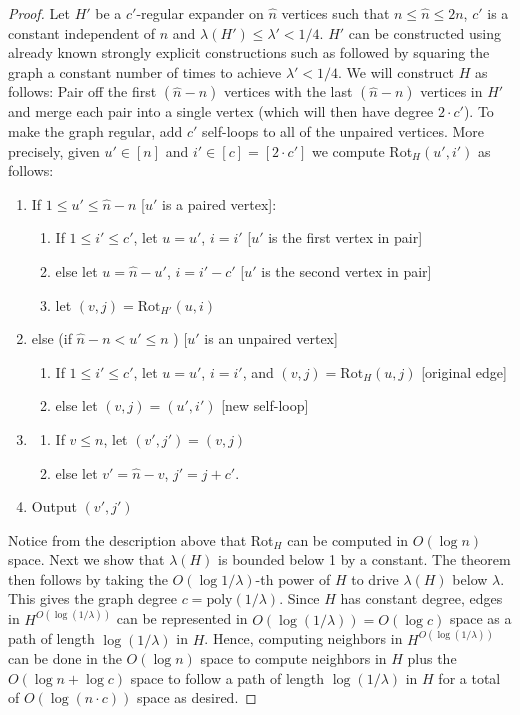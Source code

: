 \documentclass[11pt]{article}
\numberwithin{equation}{section}
\theoremstyle{definition}
\theoremstyle{plain}
\numberwithin{myalgctr}{section}
\theoremstyle{named}
\begin{document}
\begin{proof}
Let $H'$ be a $c'$-regular expander on $\hat{n}$ vertices such that $n\leq \hat{n}\leq 2n$, $c'$ is a constant independent of $n$ and $\lambda(H')\leq \lambda'<1/4$. $H'$ can be constructed using already known strongly explicit constructions such as \cite{GabberGa81,ReingoldVaWi01} followed by squaring the graph a constant number of times to achieve $\lambda'<1/4$. We will construct $H$ as follows: Pair off the first $(\hat{n}-n)$ vertices with the last $(\hat{n}-n)$ vertices in $H'$ and merge each pair into a single vertex (which will then have degree $2\cdot c'$). To make the graph regular, add $c'$ self-loops to all of the unpaired vertices. More precisely, given $u'\in[n]$ and $i'\in[c]=[2\cdot c']$ we compute Rot$_{H}(u',i')$ as follows:
\begin{enumerate}
\item If $1\leq u'\leq \hat{n}-n$ [$u'$ is a paired vertex]:
\begin{enumerate}
\item If $1\leq i'\leq c'$, let $u=u'$, $i=i'$ [$u'$ is the first vertex in pair]
\item else let $u=\hat{n}-u'$, $i=i'-c'$ [$u'$ is the second vertex in pair]
\item let $(v,j)=\mathrm{Rot}_{H'}(u,i)$
\end{enumerate}
\item else (if $\hat{n}-n< u'\leq n$ ) [$u'$ is an unpaired vertex]
\begin{enumerate}
\item If $1\leq i'\leq c'$, let $u=u'$, $i=i'$, and $(v,j)=\mathrm{Rot}_H(u,j)$ [original edge]
\item else let $(v,j)=(u',i')$ [new self-loop]
\end{enumerate}
\item
\begin{enumerate}
\item If $v\leq n$, let $(v',j')= (v,j)$
\item else let $v'=\hat{n}-v$, $j'=j+c'$.
\end{enumerate}
\item Output $(v',j')$
\end{enumerate}

Notice from the description above that Rot$_{H}$ can be computed in $O(\log n)$ space. Next we show that $\lambda(H)$ is bounded below 1 by a constant. The theorem then follows by taking the $O(\log 1/\lambda)$-th power of $H$ to drive $\lambda(H)$ below $\lambda$. This gives the graph degree $c=\mathrm{poly}(1/\lambda)$. Since $H$ has constant degree, edges in $H^{O(\log(1/\lambda))}$ can be represented in $O(\log(1/\lambda))=O(\log c)$ space as a path of length $\log(1/\lambda)$ in $H$. Hence, computing neighbors in $H^{O(\log(1/\lambda))}$ can be done in the $O(\log n)$ space to compute neighbors in $H$ plus the $O(\log n+\log c)$ space to follow a path of length $\log(1/\lambda)$ in $H$ for a total of $O(\log(n\cdot c))$ space as desired.




\end{proof}
\end{document}
